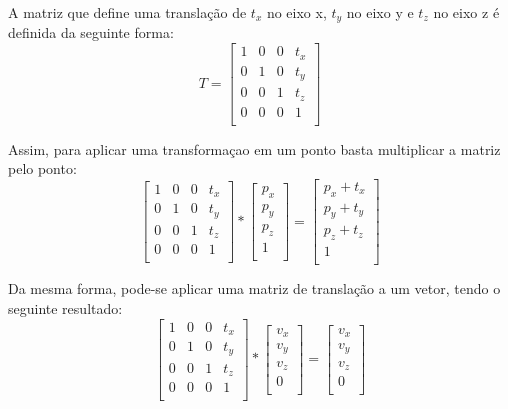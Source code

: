 A matriz que define uma translação de $t_x$ no eixo x, $t_y$ no eixo y e $t_z$ no eixo z é definida da seguinte forma:
\begin{equation}
T = 
\begin{bmatrix}
    1 & 0 & 0 & t_x\\
    0 & 1 & 0 & t_y\\
    0 & 0 & 1 & t_z\\
    0 & 0 & 0 & 1 \\
\end{bmatrix}
\end{equation}

Assim, para aplicar uma transformaçao em um ponto basta multiplicar a matriz pelo ponto:
\begin{equation}
\begin{bmatrix}
    1 & 0 & 0 & t_x\\
    0 & 1 & 0 & t_y\\
    0 & 0 & 1 & t_z\\
    0 & 0 & 0 & 1 \\
\end{bmatrix}
*
\begin{bmatrix}
    p_x \\
    p_y \\
    p_z \\
    1 \\
\end{bmatrix}
=
\begin{bmatrix}
    p_x + t_x\\
    p_y + t_y\\
    p_z + t_z\\
    1 \\
\end{bmatrix}
\end{equation}


Da mesma forma, pode-se aplicar uma matriz de translação a um vetor, tendo o seguinte resultado:
\begin{equation}
\begin{bmatrix}
    1 & 0 & 0 & t_x\\
    0 & 1 & 0 & t_y\\
    0 & 0 & 1 & t_z\\
    0 & 0 & 0 & 1 \\
\end{bmatrix}
*
\begin{bmatrix}
    v_x \\
    v_y \\
    v_z \\
    0 \\
\end{bmatrix}
=
\begin{bmatrix}
    v_x\\
    v_y\\
    v_z\\
    0 \\
\end{bmatrix}
\end{equation}

